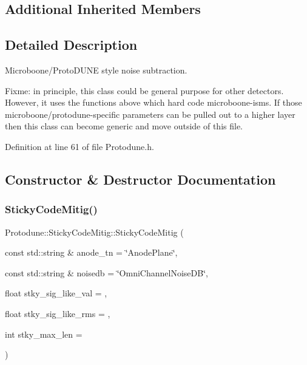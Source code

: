 \subsection*{Additional Inherited Members}


\subsection{Detailed Description}
Microboone/\+Proto\+D\+U\+NE style noise subtraction.

Fixme\+: in principle, this class could be general purpose for other detectors. However, it uses the functions above which hard code microboone-\/isms. If those microboone/protodune-\/specific parameters can be pulled out to a higher layer then this class can become generic and move outside of this file. 

Definition at line 61 of file Protodune.\+h.



\subsection{Constructor \& Destructor Documentation}
\mbox{\label{class_wire_cell_1_1_sig_proc_1_1_protodune_1_1_sticky_code_mitig_ae8377478ef6da491ced84f14b87f2127}} 
\subsubsection{\texorpdfstring{Sticky\+Code\+Mitig()}{StickyCodeMitig()}}
{\footnotesize\ttfamily Protodune\+::\+Sticky\+Code\+Mitig\+::\+Sticky\+Code\+Mitig (\begin{DoxyParamCaption}\item[{const std\+::string \&}]{anode\+\_\+tn = {\ttfamily \char`\"{}AnodePlane\char`\"{}},  }\item[{const std\+::string \&}]{noisedb = {\ttfamily \char`\"{}OmniChannelNoiseDB\char`\"{}},  }\item[{float}]{stky\+\_\+sig\+\_\+like\+\_\+val = {},  }\item[{float}]{stky\+\_\+sig\+\_\+like\+\_\+rms = {},  }\item[{int}]{stky\+\_\+max\+\_\+len = {} }\end{DoxyParamCaption})}



